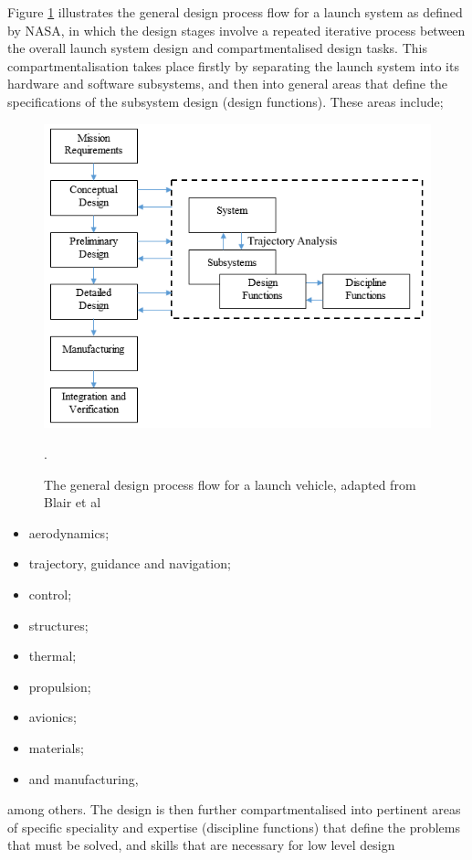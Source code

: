     Figure \ref{fig:DesignFlow} illustrates the general design process flow for a launch system as defined by NASA\cite{Blair2001}, in which the design stages involve a repeated iterative process between the overall launch system design and compartmentalised design tasks. This compartmentalisation takes place firstly by separating the
    launch system into its hardware and software subsystems, and then into general areas that define the specifications of the subsystem design (design functions). These areas include;
    \begin{figure}[ht]
    	\centering
    	\includegraphics[width=0.7\linewidth]{figures/2_literature-review/DesignFlow}
    	\caption{The general design process flow for a launch vehicle, adapted from Blair et al\cite{Blair2001}}.
    	\label{fig:DesignFlow}
    \end{figure}
    \begin{itemize}
    	\setlength\itemsep{.2em}
    	\item aerodynamics;
    	\item trajectory, guidance and navigation;
    	\item control;
    	\item structures;
    	\item thermal;
    	\item propulsion;
    	\item avionics;
    	\item materials;
    	\item and manufacturing,
    \end{itemize}
    among others\cite{Blair2001}. The design is then further compartmentalised into pertinent areas of specific speciality and expertise (discipline functions) that define the problems that must be solved, and skills that are necessary for low level design
    

